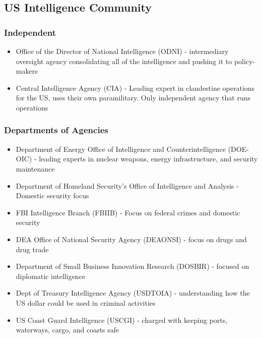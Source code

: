 \documentclass[11pt]{article}
\begin{document}
\subsection{US Intelligence Community}
\label{sec:org29da6a0}
\subsubsection{Independent}
\label{sec:org83b0b4d}
\begin{itemize}
\item Office of the Director of National Intelligence (ODNI) - intermediary oversight agency consolidating all of the intelligence and pushing it to policy-makers
\item Central Intelligence Agency (CIA) - Leading expert in clandestine operations for the US, uses their own paramilitary. Only independent agency that runs operations
\end{itemize}
\subsubsection{Departments of Agencies}
\label{sec:org67ffa56}
\begin{itemize}
\item Department of Energy Office of Intelligence and Counterintelligence (DOE-OIC) - leading experts in nuclear weapons, energy infrastructure, and security maintenance
\item Department of Homeland Security's Office of Intelligence and Analysis - Domestic security focus
\item FBI Intelligence Branch (FBIIB) - Focus on federal crimes and domestic security
\item DEA Office of National Security Agency (DEAONSI) - focus on drugs and drug trade
\item Department of Small Business Innovation Research (DOSBIR) - focused on diplomatic intelligence
\item Dept of Treasury Intelligence Agency (USDTOIA) - understanding how the US dollar could be used in criminal activities
\item US Coast Guard Intelligence (USCGI) - charged with keeping ports, waterways, cargo, and coasts safe
\end{itemize}
\end{document}
